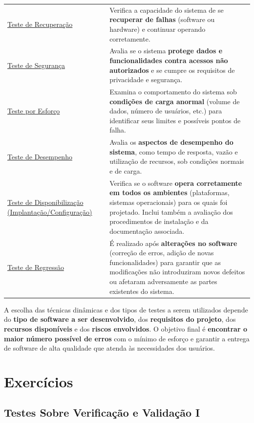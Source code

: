 \documentclass[
]{book}
\begin{document}
\begin{longtable}[]{@{}
  >{\centering\arraybackslash}p{}
  >{\raggedright\arraybackslash}p{}@{}}
\toprule\noalign{}
\endhead
\bottomrule\noalign{}
\endlastfoot
\ul{Teste de Recuperação} & Verifica a capacidade do sistema de se \textbf{recuperar de falhas} (software ou hardware) e continuar operando corretamente. \\
\ul{Teste de Segurança} & Avalia se o sistema \textbf{protege dados e funcionalidades contra acessos não autorizados} e se cumpre os requisitos de privacidade e segurança. \\
\ul{Teste por Esforço} & Examina o comportamento do sistema sob \textbf{condições de carga anormal} (volume de dados, número de usuários, etc.) para identificar seus limites e possíveis pontos de falha. \\
\ul{Teste de Desempenho} & Avalia os \textbf{aspectos de desempenho do sistema}, como tempo de resposta, vazão e utilização de recursos, sob condições normais e de carga. \\
\ul{Teste de Disponibilização (Implantação/Configuração)} & Verifica se o software \textbf{opera corretamente em todos os ambientes} (plataformas, sistemas operacionais) para os quais foi projetado. Inclui também a avaliação dos procedimentos de instalação e da documentação associada. \\
\ul{Teste de Regressão} & É realizado após \textbf{alterações no software} (correção de erros, adição de novas funcionalidades) para garantir que as modificações não introduziram novos defeitos ou afetaram adversamente as partes existentes do sistema. \\
\end{longtable}

A escolha das técnicas dinâmicas e dos tipos de testes a serem utilizados depende do \textbf{tipo de software a ser desenvolvido}, dos \textbf{requisitos do projeto}, dos \textbf{recursos disponíveis} e dos \textbf{riscos envolvidos}. O objetivo final é \textbf{encontrar o maior número possível de erros} com o mínimo de esforço e garantir a entrega de software de alta qualidade que atenda às necessidades dos usuários.

\section{Exercícios}\label{exercuxedcios}

\subsection{Testes Sobre Verificação e Validação I}\label{testes-sobre-verificauxe7uxe3o-e-validauxe7uxe3o-i}
\end{document}
